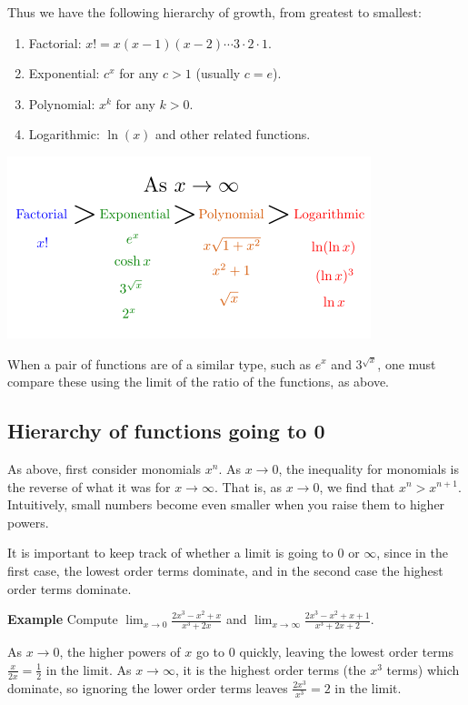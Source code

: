 \documentclass[twoside,openright,titlepage,a4paper]{book}
\begin{document}
\begin{sloppypar}
Thus we have the following hierarchy of growth, from greatest to smallest:
\begin{enumerate}
	\item Factorial: $x! = x(x-1)(x-2)\dotsm 3 \cdot 2 \cdot 1$.
	\item Exponential: $c^x$ for any $c>1$ (usually $c=e$).
	\item Polynomial: $x^k$ for any $k>0$.
	\item Logarithmic: $\ln(x)$ and other related functions.
\end{enumerate}

\begin{center}\includegraphics[scale=0.6]{OrdersOfGrowth}\end{center}

When a pair of functions are of a similar type, such as $e^x$ and $3^{\sqrt x}$, one must compare these using the limit of the ratio of the functions, as above.

\subsection{Hierarchy of functions going to 0}

As above, first consider monomials $x^n$. As $x \rightarrow 0$, the inequality for monomials is the reverse of what it was for $x \rightarrow \infty$. That is, as $x \rightarrow 0$, we find that $x^n > x^{n+1}$. Intuitively, small numbers become even smaller when you raise them to higher powers.

It is important to keep track of whether a limit is going to 0 or $\infty$, since in the first case, the lowest order terms dominate, and in the second case the highest order terms dominate.

\textbf{Example} Compute $\displaystyle \lim_{x \rightarrow 0} \frac{2x^3-x^2+x}{x^3+2x}$ and $\displaystyle \lim_{x \rightarrow \infty} \frac{2x^3-x^2+x+1}{x^3+2x+2}$.
\begin{examplebox}
As $x \rightarrow 0$, the higher powers of $x$ go to 0 quickly, leaving the lowest order terms $\frac{x}{2x} = \frac{1}{2}$ in the limit.
As $x \rightarrow \infty$, it is the highest order terms (the $x^3$ terms) which dominate, so ignoring the lower order terms leaves $\frac{2x^3}{x^3} = 2$ in the limit.
\end{examplebox}


\end{sloppypar}
\end{document}
